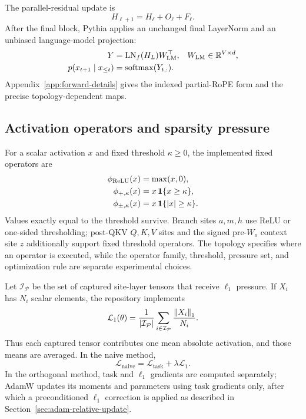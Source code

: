 The parallel-residual update is
\begin{equation}
    H_{\ell+1}=H_\ell+O_\ell+F_\ell.
    \label{eq:parallel-residual}
\end{equation}
After the final block, Pythia applies an unchanged final LayerNorm and an
unbiased language-model projection:
\begin{align}
    Y &= \operatorname{LN}_f(H_L)W_{\mathrm{LM}}^{\top},
    & W_{\mathrm{LM}}&\in\mathbb{R}^{V\times d},
    \label{eq:lm-logits}\\
    p(x_{t+1}\mid x_{\le t})&=\operatorname{softmax}(Y_{t,:}).
    \label{eq:next-token-probability}
\end{align}
Appendix~\ref{app:forward-details} gives the indexed partial-RoPE form and the
precise topology-dependent maps.

\subsection{Activation operators and sparsity pressure}
\label{sec:activation-operators}

For a scalar activation $x$ and fixed threshold $\kappa\ge0$, the implemented
fixed operators are
\begin{align}
    \phi_{\mathrm{ReLU}}(x)
      &=\max(x,0),
    \label{eq:relu-operator}\\
    \phi_{+,\kappa}(x)
      &=x\,\mathbf{1}\{x\ge\kappa\},
    \label{eq:one-sided-operator}\\
    \phi_{\pm,\kappa}(x)
      &=x\,\mathbf{1}\{\left\lvert x\right\rvert\ge\kappa\}.
    \label{eq:symmetric-operator}
\end{align}
Values exactly equal to the threshold survive. Branch sites $a,m,h$ use ReLU
or one-sided thresholding; post-QKV $Q,K,V$ sites and the signed pre-$W_o$
context site $z$ additionally support fixed threshold operators. The topology
specifies where an operator is executed, while the operator family, threshold,
pressure set, and optimization rule are separate experimental choices.

Let $\mathcal I_{\mathcal P}$ be the set of captured site-layer tensors that
receive $\ell_1$ pressure. If $X_i$ has $N_i$ scalar elements, the repository
implements
\begin{equation}
    \mathcal L_1(\theta)
      =\frac{1}{\left\lvert \mathcal I_{\mathcal P}\right\rvert}
       \sum_{i\in\mathcal I_{\mathcal P}}
       \frac{\left\lVert X_i\right\rVert_1}{N_i}.
    \label{eq:l1-pressure}
\end{equation}
Thus each captured tensor contributes one mean absolute activation, and those
means are averaged. In the naive method,
\begin{equation}
    \mathcal L_{\mathrm{naive}}
      =\mathcal L_{\mathrm{task}}+\lambda\mathcal L_1.
    \label{eq:naive-objective}
\end{equation}
In the orthogonal method, task and $\ell_1$ gradients are computed separately;
AdamW updates its moments and parameters using task gradients only, after which
a preconditioned $\ell_1$ correction is applied as described in
Section~\ref{sec:adam-relative-update}.

